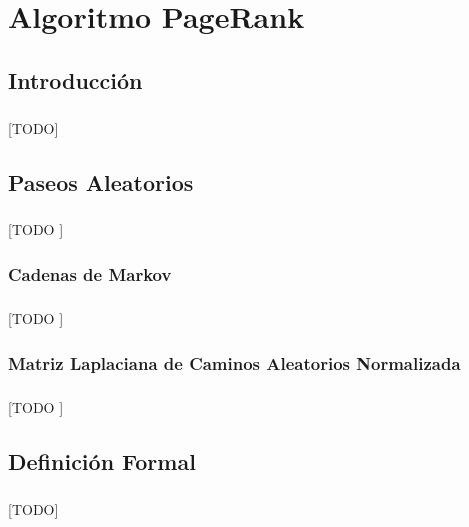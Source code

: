 \documentclass{subfiles}
\begin{document}
  \chapter{Algoritmo PageRank}
  \label{chap:pagerank}

    \section{Introducción}
    \label{sec:pagerank_intro}

      \paragraph{}
      [TODO]

    \section{Paseos Aleatorios}
    \label{sec:random_walks}

      \paragraph{}
      [TODO ]

      \subsection{Cadenas de Markov}
      \label{sec:markov_chains}

        \paragraph{}
        [TODO ]

      \subsection{Matriz Laplaciana de Caminos Aleatorios Normalizada}
      \label{sec:random_walk_normalized_laplacian_matrix}

        \paragraph{}
        [TODO ]

    \section{Definición Formal}
    \label{sec:pagerank_formal_definition}

      \paragraph{}
      [TODO]
\end{document}
